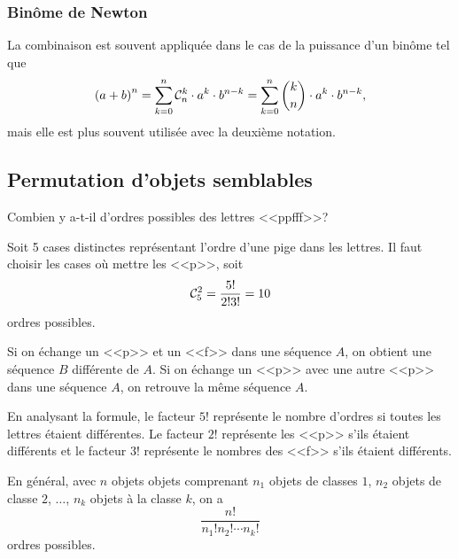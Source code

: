 \documentclass[11pt]{article}
\newcommand\comb[2]{%
	\ensuremath{%
		\mathcal{C}_{#2}^{#1}%
	}%
}%
\theoremstyle{remark}
\theoremstyle{definition}
\begin{document}
\subsubsection{Binôme de Newton}
La combinaison est souvent appliquée dans le cas de la puissance d'un binôme
tel que
\begin{equation*}
	\left(a+b\right)^n
	=\sum_{k=0}^n\comb{k}{n}\cdot a^k\cdot b^{n-k}
	=\sum_{k=0}^n{{k}\choose{n}}\cdot a^k\cdot b^{n-k},
\end{equation*}
mais elle est plus souvent utilisée avec la deuxième notation.

\subsection{Permutation d'objets semblables}
\begin{exemple}
	Combien y a-t-il d'ordres possibles des lettres <<ppfff>>?

	Soit 5 cases distinctes représentant l'ordre d'une pige dans les lettres.
	Il faut choisir les cases où mettre les <<p>>, soit
	\begin{equation*}
		\comb{2}{5}=\frac{5!}{2!3!}=10
	\end{equation*}
	ordres possibles.
	
	Si on échange un <<p>> et un <<f>> dans une séquence $A$, on obtient une
	séquence $B$ différente de $A$. Si on échange un <<p>> avec une autre <<p>>
	dans une séquence $A$, on retrouve la même séquence $A$.

	En analysant la formule, le facteur $5!$ représente le nombre d'ordres si
	toutes les lettres étaient différentes. Le facteur $2!$ représente les
	<<p>> s'ils étaient différents et le facteur $3!$ représente le nombres des
	<<f>> s'ils étaient différents.
\end{exemple}

En général, avec $n$ objets objets comprenant $n_1$ objets de classes $1$,
$n_2$ objets de classe $2$, $\dots$, $n_k$ objets à la classe $k$, on a
\begin{equation*}
	\frac{n!}{n_1!n_2!\cdots n_k!}
\end{equation*}
ordres possibles.
\end{document}

